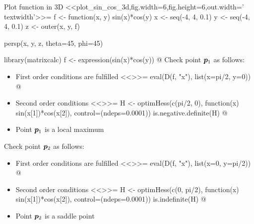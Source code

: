 \documentclass
[answers]
{exercise_sheet}
\begin{document}
\makeatletter\if@answers\begin{Answer}{25}
Plot function in 3D
<<plot_sin_cos_3d,fig.width=6,fig.height=6,out.width='\\textwidth'>>=
f <- function(x, y) sin(x)*cos(y)
x <- seq(-4, 4, 0.1)
y <- seq(-4, 4, 0.1)
z <- outer(x, y, f)

persp(x, y, z, theta=45, phi=45)

library(matrixcalc)
f <- expression(sin(x)*cos(y))
@
Check point $\bm{p}_1$ as follows:
\begin{itemize}
\item First order conditions are fulfilled
<<>>=
eval(D(f, "x"), list(x=pi/2, y=0))
@
\item Second order conditions
<<>>=
H <- optimHess(c(pi/2, 0), 
               function(x) sin(x[1])*cos(x[2]),
               control=(ndeps=0.0001))
is.negative.definite(H)
@
\item Point $\bm{p}_1$ is a local maximum
\end{itemize}
Check point $\bm{p}_2$ as follows:
\begin{itemize}
\item First order conditions are fulfilled
<<>>=
eval(D(f, "x"), list(x=0, y=pi/2))
@
\item Second order conditions
<<>>=
H <- optimHess(c(0, pi/2), 
               function(x) sin(x[1])*cos(x[2]),
               control=(ndeps=0.0001))
is.indefinite(H)
@
\item Point $\bm{p}_2$ is a saddle point
\end{itemize}
\end{Answer}\fi\makeatother


%
%
\end{document}

